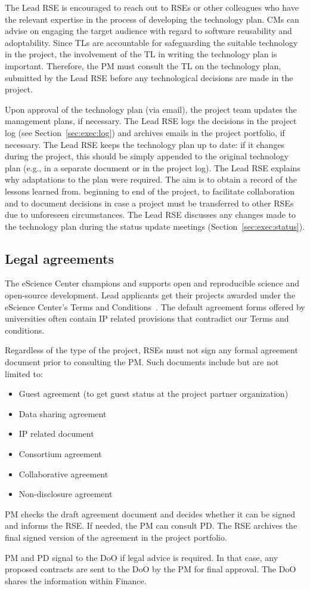 The Lead RSE is encouraged to reach out to RSEs or other colleagues who have the relevant expertise in the process of
developing the technology plan. CMs can advise on engaging the target audience with regard to software reusability and
adoptability. Since TLs are accountable for safeguarding the suitable technology in the project, the involvement of the
TL in writing the technology plan is important. Therefore, the PM must consult the TL on the technology plan, submitted
by the Lead RSE before any technological decisions are made in the project.

Upon approval of the technology plan (via email), the project team updates the management plans, if necessary. The Lead
RSE logs the decisions in the project log (see Section~\ref{sec:exec:log}) and archives emails in the project
portfolio, if necessary. The Lead RSE keeps the technology plan up to date: if it changes during the project, this
should be simply appended to the original technology plan (e.g., in a separate document or in the project log). The
Lead RSE explains why adaptations to the plan were required. The aim is to obtain a record of the lessons learned from.
beginning to end of the project, to facilitate collaboration and to document decisions in case a project must be
transferred to other RSEs due to unforeseen circumstances. The Lead RSE discusses any changes made to the technology
plan during the status update meetings (Section~\ref{sec:exec:status}).

\subsection{Legal agreements}
\label{sec:init:legal}
The eScience Center champions and supports open and reproducible science and open-source development. Lead applicants
get their projects awarded under the eScience Center's Terms and Conditions~\cite{nlesc-terms}. The default agreement forms offered by universities often contain IP related provisions that contradict
our Terms and conditions.

Regardless of the type of the project, RSEs must not sign any formal agreement document prior to consulting the PM. Such
documents include but are not limited to:
\begin{itemize}
\item Guest agreement (to get guest status at the project partner organization)
\item Data sharing agreement
\item IP related document
\item Consortium agreement
\item Collaborative agreement
\item Non-disclosure agreement
\end{itemize}

PM checks the draft agreement document and decides whether it can be signed and informs the RSE. If needed, the PM can
consult PD. The RSE archives the final signed version of the agreement in the project portfolio.

PM and PD signal to the DoO if legal advice is required. In that case, any proposed contracts are sent to the DoO by the
PM for final approval. The DoO shares the information within Finance.

